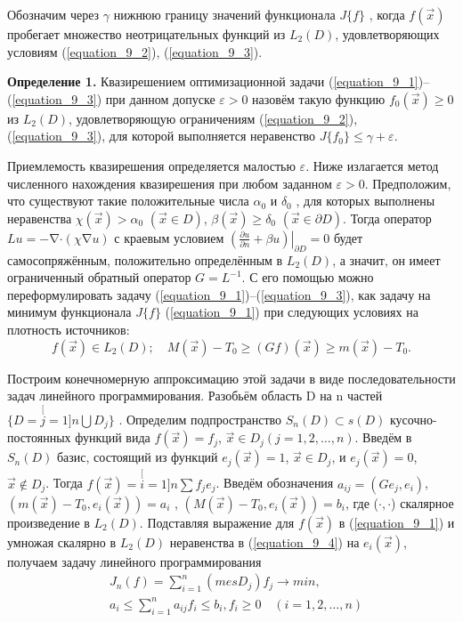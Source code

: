 Обозначим через $\gamma$ нижнюю границу значений функционала $J\{f\}$ , когда  $f(\vec x)$   пробегает множество неотрицательных функций из $L_2(D)$, удовлетворяющих условиям (\ref{equation_9_2}), (\ref{equation_9_3}).

\textbf{Определение 1. } Квазирешением оптимизационной задачи (\ref{equation_9_1})--(\ref{equation_9_3}) при данном допуске $\varepsilon {>}0$ назовём такую функцию $f_0(\vec x){\ge} 0$  из $L_2(D)$, удовлетворяющую ограничениям (\ref{equation_9_2}), (\ref{equation_9_3}), для которой выполняется неравенство $J\{f_0\}{\le} \gamma + \varepsilon$.

Приемлемость квазирешения определяется малостью $\varepsilon$. Ниже излагается метод численного нахождения квазирешения при любом заданном $\varepsilon {>}0$. Предположим, что существуют такие положительные числа $\alpha_0$ и $\delta_0 $ , для которых выполнены неравенства $\chi(\vec x){>}\alpha_0$ $(\vec x {\in} D)$, $\beta(\vec x){\ge} \delta_0$ $(\vec x {\in} \partial D)$. Тогда оператор $Lu{=}{-}\mathop{\nabla}\cdot(\chi\mathop{\nabla}u)$ с краевым условием $\left.\left(\frac{\partial u}{\partial n}+ \beta u\right)\right|_{\partial D}{=}0$ будет самосопряжённым, положительно определённым в $L_2(D)$, а значит, он имеет ограниченный обратный оператор $G{=}L^{-1}$. С его помощью можно переформулировать задачу (\ref{equation_9_1})--(\ref{equation_9_3}),  как задачу на минимум функционала $J\{f\}$ (\ref{equation_9_1}) при следующих условиях на плотность источников:
              \begin{equation} \label{equation_9_4}
              f(\vec x)\in L_2(D);\quad M(\vec x)-T_0\ge (Gf)(\vec x)\ge m(\vec x)-T_0.
              \end{equation}

Построим конечномерную аппроксимацию этой задачи в виде последовательности задач линейного программирования. Разобьём область D на n частей $\{D{=}{\stackrel[j=1]{n}{\bigcup}}D_j\}$ . Определим подпространство $S_n(D){\subset} s(D)$ кусочно-постоянных функций вида $f(\vec x){=}f_j$, $\vec x{\in} D_j (j{=}1,2,\ldots,n)$. Введём в $S_n(D)$ базис, состоящий из функций $e_j(\vec x){=}1$, $\vec x{\in} D_j$, и $e_j(\vec x){=}0$, $\vec x{\notin} D_j$. Тогда $f(\vec x){=}{\stackrel[i=1]{n}{\sum}}f_je_j$. Введём обозначения $a_{ij}{=}(Ge_j,e_i)$, $(m(\vec x){-}T_0,e_i(\vec x)){=}a_i$ , $(M(\vec x)-T_0,e_i(\vec x)){=}b_i$, где ($\cdot {,}\cdot$) скалярное произведение в $L_2(D)$. Подставляя выражение для $f(\vec x)$ в (\ref{equation_9_1}) и умножая скалярно в $L_2(D)$ неравенства в (\ref{equation_9_4}) на $e_i(\vec x)$, получаем задачу линейного программирования
 		\begin{equation}\label{equation_9_5}\begin{split}
        &J_n(f)=\sum_{i=1}^n(mesD_j)f_j\to min,\\
        &a_i\le \sum_{i=1}^na_{ij}f_i\le b_i,f_i\ge 0\quad (i=1,2,\ldots,n)
         \end{split}\end{equation}


